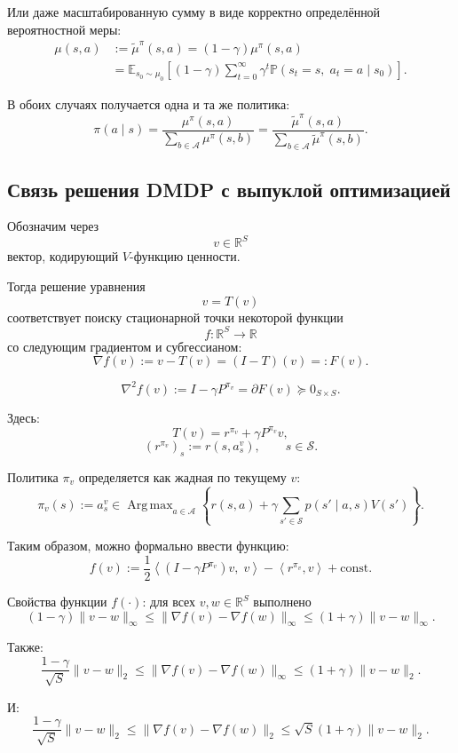 \documentclass[12pt,a4paper]{article}
\begin{document}
Или даже масштабированную сумму в виде корректно определённой вероятностной меры:
\[
\begin{aligned}
\mu(s,a)
&:=
\tilde \mu^\pi(s,a)
=
(1-\gamma)\mu^\pi(s,a)
\\
&=
\mathbb E_{s_0 \sim \mu_0}
\left[
(1-\gamma)
\sum_{t=0}^{\infty}
\gamma^t
\mathbb P(s_t=s,\; a_t=a \mid s_0)
\right].
\end{aligned}
\]

В обоих случаях получается одна и та же политика:
\[
\pi(a \mid s)
=
\frac{\mu^\pi(s,a)}
{\sum_{b \in \mathcal A}\mu^\pi(s,b)}
=
\frac{\tilde \mu^\pi(s,a)}
{\sum_{b \in \mathcal A}\tilde \mu^\pi(s,b)}.
\]

\subsection{Связь решения DMDP с выпуклой оптимизацией}

Обозначим через
\[
v \in \mathbb R^S
\]
вектор, кодирующий $V$-функцию ценности.

Тогда решение уравнения
\[
v = T(v)
\]
соответствует поиску стационарной точки некоторой функции
\[
f : \mathbb R^S \to \mathbb R
\]
со следующим градиентом и субгессианом:
\[
\nabla f(v)
:=
v-T(v)
=
(I-T)(v)
=:
F(v).
\]

\[
\nabla^2 f(v)
:=
I-\gamma P^{\pi_v}
=
\partial F(v)
\succeq 0_{S \times S}.
\]

Здесь:
\[
T(v)
=
r^{\pi_v}
+
\gamma P^{\pi_v}v,
\]
\[
\left(r^{\pi_v}\right)_s
:=
r(s,a_s^v),
\qquad
s \in \mathcal S.
\]

Политика $\pi_v$ определяется как жадная по текущему $v$:
\[
\pi_v(s)
:=
a_s^v
\in
\operatorname{Arg\,max}_{a \in \mathcal A}
\left\{
r(s,a)
+
\gamma
\sum_{s' \in \mathcal S}
p(s'\mid a,s)V(s')
\right\}.
\]

Таким образом, можно формально ввести функцию:
\[
f(v)
:=
\frac{1}{2}
\left\langle
\left(
I-\gamma P^{\pi_v}
\right)v,\;
v
\right\rangle
-
\left\langle
r^{\pi_v},v
\right\rangle
+
\mathrm{const}.
\]

Свойства функции $f(\cdot)$: для всех $v,w \in \mathbb R^S$ выполнено
\[
(1-\gamma)\|v-w\|_\infty
\le
\|\nabla f(v)-\nabla f(w)\|_\infty
\le
(1+\gamma)\|v-w\|_\infty.
\]

Также:
\[
\frac{1-\gamma}{\sqrt S}
\|v-w\|_2
\le
\|\nabla f(v)-\nabla f(w)\|_\infty
\le
(1+\gamma)\|v-w\|_2.
\]

И:
\[
\frac{1-\gamma}{\sqrt S}
\|v-w\|_2
\le
\|\nabla f(v)-\nabla f(w)\|_2
\le
\sqrt S(1+\gamma)\|v-w\|_2.
\]
\end{document}

